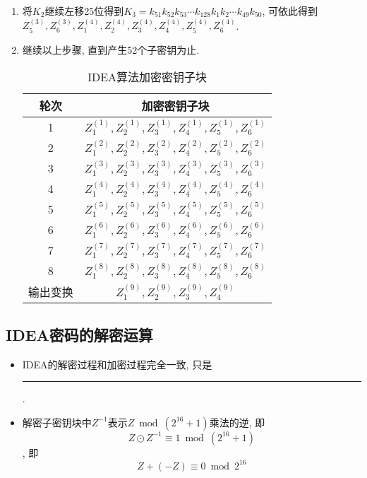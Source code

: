\documentclass[UTF8]{ctexart}
\newcommand\hl{\bgroup\markoverwith
  {\textcolor{yellow}{\rule[-.5ex]{2pt}{2.5ex}}}\ULon}
\begin{document}
\begin{enumerate}
        \item 将$K_2$继续左移25位得到$K_3=k_{51}k_{52}k_{53}\cdots k_{128}k_1k_2\cdots k_{49}k_{50}$, 可依此得到$Z_5^{(3)}, Z_6^{(3)}, Z_1^{(4)}, Z_2^{(4)}, Z_3^{(4)}, Z_4^{(4)}, Z_5^{(4)}, Z_6^{(4)}$.
        \item 继续以上步骤, 直到产生52个子密钥为止.
        \begin{table}[h]
            \centering
            \caption{IDEA算法加密密钥子块}
            \begin{tabular}{|c|c|}
                \hline
                轮次 &加密密钥子块\\
                \hline
                1 &$Z^{(1)}_1, Z^{(1)}_2, Z^{(1)}_3, Z^{(1)}_4, Z^{(1)}_5, Z^{(1)}_6$\\
                \hline
                2 &$Z^{(2)}_1, Z^{(2)}_2, Z^{(2)}_3, Z^{(2)}_4, Z^{(2)}_5, Z^{(2)}_6$\\
                \hline
                3 &$Z^{(3)}_1, Z^{(3)}_2, Z^{(3)}_3, Z^{(3)}_4, Z^{(3)}_5, Z^{(3)}_6$\\
                \hline
                4 &$Z^{(4)}_1, Z^{(4)}_2, Z^{(4)}_3, Z^{(4)}_4, Z^{(4)}_5, Z^{(4)}_6$\\
                \hline
                5 &$Z^{(5)}_1, Z^{(5)}_2, Z^{(5)}_3, Z^{(5)}_4, Z^{(5)}_5, Z^{(5)}_6$\\
                \hline
                6 &$Z^{(6)}_1, Z^{(6)}_2, Z^{(6)}_3, Z^{(6)}_4, Z^{(6)}_5, Z^{(6)}_6$\\
                \hline
                7 &$Z^{(7)}_1, Z^{(7)}_2, Z^{(7)}_3, Z^{(7)}_4, Z^{(7)}_5, Z^{(7)}_6$\\
                \hline
                8 &$Z^{(8)}_1, Z^{(8)}_2, Z^{(8)}_3, Z^{(8)}_4, Z^{(8)}_5, Z^{(8)}_6$\\
                \hline
                输出变换 &$Z^{(9)}_1, Z^{(9)}_2, Z^{(9)}_3, Z^{(9)}_4$\\
                \hline
            \end{tabular}
        \end{table}
    \end{enumerate}

    \subsection{IDEA密码的解密运算}
    \begin{itemize}
        \item IDEA的解密过程和加密过程完全一致, 只是\hl{解密用的子密钥块不同}.
        \item 解密子密钥块中$Z^{-1}$表示$Z\bmod (2^{16}+1)$乘法的逆, 即
        $$Z\odot Z^{-1}\equiv 1\bmod (2^{16}+1)$$, 即
        $$Z+(-Z)\equiv 0\bmod 2^{16}$$
    \end{itemize}
\end{document}
